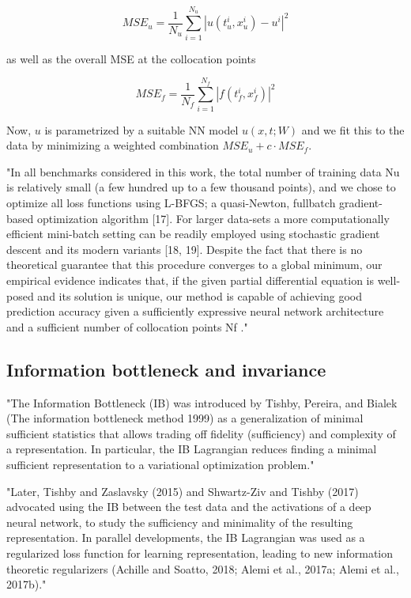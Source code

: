 \documentclass[english]{article}
\begin{document}
$$MSE_u = \frac{1}{N_u}\sum_{i=1}^{N_u}|u(t_u^i,x_u^i)-u^i|^2$$

as well as the overall MSE at the collocation points

$$MSE_f = \frac{1}{N_f}\sum_{i=1}^{N_f}|f(t_f^i,x_f^i)|^2$$

\item Now, $u$ is parametrized by a suitable NN model $u(x,t;W)$ and we fit this to the data by minimizing a weighted combination $MSE_u +c\cdot MSE_f$.

"In all benchmarks considered in this work, the total number of training
data Nu is relatively small (a few hundred up to a few thousand points), and
we chose to optimize all loss functions using L-BFGS; a quasi-Newton, fullbatch gradient-based optimization algorithm [17]. For larger data-sets a more
computationally efficient mini-batch setting can be readily employed using
stochastic gradient descent and its modern variants [18, 19]. Despite the
fact that there is no theoretical guarantee that this procedure converges to
a global minimum, our empirical evidence indicates that, if the given partial
differential equation is well-posed and its solution is unique, our method is
capable of achieving good prediction accuracy given a sufficiently expressive
neural network architecture and a sufficient number of collocation points Nf ." 
\eitem 



\subsection{Information bottleneck and invariance}
%
\bitem
\item "The Information Bottleneck (IB) was introduced by Tishby, Pereira, and Bialek (The information bottleneck method 1999) as a generalization
of minimal sufficient statistics that allows trading off fidelity (sufficiency) and complexity
of a representation. In particular, the IB Lagrangian reduces finding a minimal sufficient
representation to a variational optimization problem." 

"Later, Tishby and Zaslavsky (2015)
and Shwartz-Ziv and Tishby (2017) advocated using the IB between the test data and the
activations of a deep neural network, to study the sufficiency and minimality of the resulting
representation. In parallel developments, the IB Lagrangian was used as a regularized
loss function for learning representation, leading to new information theoretic regularizers
(Achille and Soatto, 2018; Alemi et al., 2017a; Alemi et al., 2017b)."
\end{document}
